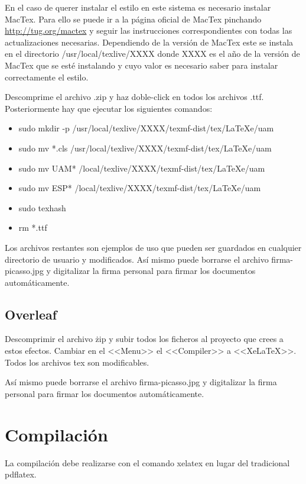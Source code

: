 \documentclass[numerado,carta]{plantillasEPS} %
\begin{document}
En el caso de querer instalar el estilo en este sistema es necesario instalar MacTex. Para ello se puede ir a la página oficial de MacTex pinchando \href{aquí}{http://tug.org/mactex} y seguir las instrucciones correspondientes con todas las actualizaciones necesarias. Dependiendo de la versión de MacTex este se instala en el directorio /usr/local/texlive/XXXX donde XXXX es el año de la versión de MacTex que se esté instalando y cuyo valor es necesario saber para instalar correctamente el estilo.

Descomprime el archivo .zip y haz doble-click en todos los archivos .ttf. Posteriormente hay que ejecutar los siguientes comandos:
\begin{itemize}
    \item sudo mkdir -p /usr/local/texlive/XXXX/texmf-dist/tex/LaTeXe/uam
    \item sudo mv *.cls /usr/local/texlive/XXXX/texmf-dist/tex/LaTeXe/uam
    \item sudo mv UAM* /local/texlive/XXXX/texmf-dist/tex/LaTeXe/uam
    \item sudo mv ESP* /local/texlive/XXXX/texmf-dist/tex/LaTeXe/uam
    \item sudo texhash
    \item rm *.ttf
\end{itemize}

Los archivos restantes son ejemplos de uso que pueden ser guardados en cualquier directorio de usuario y modificados. Así mismo puede borrarse el archivo firma-picasso.jpg y digitalizar la firma personal para firmar los documentos automáticamente.


\section{Overleaf}
Descomprimir el archivo \.zip y subir todos los ficheros al proyecto que crees a estos efectos. Cambiar en el <<Menu>> el <<Compiler>> a <<XeLaTeX>>. Todos los archivos \.tex son modificables.

Así mismo puede borrarse el archivo firma-picasso.jpg y digitalizar la firma personal para firmar los documentos automáticamente.
    
\chapter{Compilación}

La compilación debe realizarse con el comando xelatex en lugar del tradicional pdflatex.
\end{document}
